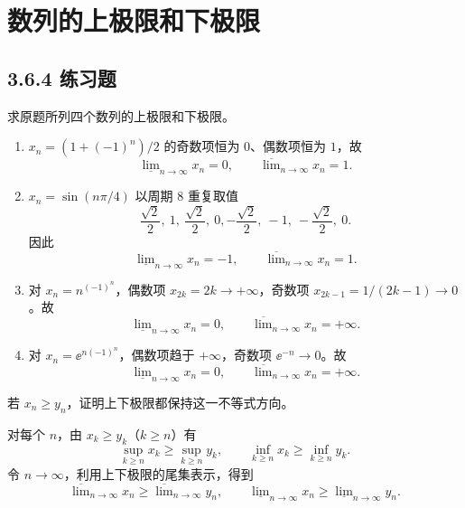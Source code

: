 \section{数列的上极限和下极限}
\subsection*{3.6.4 练习题}

\begin{xexercise}[3.6.4 练习题 1]
求原题所列四个数列的上极限和下极限。
\end{xexercise}
\begin{xsolution}
\begin{enumerate}[label=(\arabic*)]
  \item $x_n=(1+(-1)^n)/2$ 的奇数项恒为 $0$、偶数项恒为 $1$，故
  \[
    \underline{\lim}_{n\to\infty}x_n=0,
    \qquad
    \overline{\lim}_{n\to\infty}x_n=1.
  \]

  \item $x_n=\sin(n\pi/4)$ 以周期 $8$ 重复取值
  \[
    \frac{\sqrt2}{2},\ 1,\ \frac{\sqrt2}{2},\ 0,
    -\frac{\sqrt2}{2},\ -1,\ -\frac{\sqrt2}{2},\ 0.
  \]
  因此
  \[
    \underline{\lim}_{n\to\infty}x_n=-1,
    \qquad
    \overline{\lim}_{n\to\infty}x_n=1.
  \]

  \item 对 $x_n=n^{(-1)^n}$，偶数项 $x_{2k}=2k\to+\infty$，奇数项 $x_{2k-1}=1/(2k-1)\to0$。故
  \[
    \underline{\lim}_{n\to\infty}x_n=0,
    \qquad
    \overline{\lim}_{n\to\infty}x_n=+\infty.
  \]

  \item 对 $x_n=\ee^{n(-1)^n}$，偶数项趋于 $+\infty$，奇数项 $\ee^{-n}\to0$。故
  \[
    \underline{\lim}_{n\to\infty}x_n=0,
    \qquad
    \overline{\lim}_{n\to\infty}x_n=+\infty.
  \]
\end{enumerate}
\end{xsolution}

\begin{xexercise}[3.6.4 练习题 2]
若 $x_n\geqslant y_n$，证明上下极限都保持这一不等式方向。
\end{xexercise}
\begin{xsolution}
对每个 $n$，由 $x_k\geqslant y_k$（$k\geqslant n$）有
\[
  \sup_{k\geqslant n}x_k\geqslant\sup_{k\geqslant n}y_k,
  \qquad
  \inf_{k\geqslant n}x_k\geqslant\inf_{k\geqslant n}y_k.
\]
令 $n\to\infty$，利用上下极限的尾集表示，得到
\[
  \overline{\lim}_{n\to\infty}x_n
  \geqslant\overline{\lim}_{n\to\infty}y_n,
  \qquad
  \underline{\lim}_{n\to\infty}x_n
  \geqslant\underline{\lim}_{n\to\infty}y_n.
\]
\end{xsolution}

